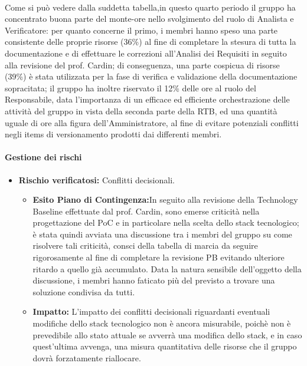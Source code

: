 \paragraph{}
Come si può vedere dalla suddetta tabella,in questo quarto periodo il gruppo ha concentrato buona parte del monte-ore nello svolgimento
del ruolo di Analista e Verificatore: per quanto concerne il primo, i membri hanno speso una parte consistente delle proprie
risorse  (36\%) al fine di completare la stesura di tutta la documentazione e di effettuare le correzioni all'Analisi dei Requisiti
in seguito alla revisione del prof. Cardin; di conseguenza, una parte cospicua di risorse (39\%) è stata utilizzata per la fase di verifica 
e validazione della documentazione sopracitata; il gruppo ha inoltre riservato il 12\% delle ore al ruolo del Responsabile, data l'importanza di un efficace
ed efficiente orchestrazione delle attività del gruppo in vista della seconda parte della RTB, ed una quantità uguale di ore alla figura dell'Amministratore, al fine
di evitare potenziali conflitti negli items di versionamento prodotti dai differenti membri.

\paragraph{Gestione dei rischi}

\begin{itemize}
    \item \textbf{Rischio verificatosi:} Conflitti decisionali.
    \begin{itemize}
        \item \textbf{Esito Piano di Contingenza:}In seguito alla revisione della Technology Baseline effettuate dal prof. Cardin, sono emerse criticità nella progettazione
        del PoC e in particolare nella scelta dello stack tecnologico; è stata quindi avviata una discussione tra i membri del gruppo su come risolvere tali criticità,
        consci della tabella di marcia da seguire rigorosamente al fine di completare la revisione PB evitando ulteriore ritardo a quello già accumulato. Data la 
        natura sensibile dell'oggetto della discussione, i membri hanno faticato più del previsto a trovare una soluzione condivisa da tutti.
        \item \textbf{Impatto:} L'impatto dei conflitti decisionali riguardanti eventuali modifiche dello stack tecnologico non è ancora misurabile, poichè non è
        prevedibile allo stato attuale  se avverrà una modifica dello stack, e in caso quest'ultima avvenga, una misura quantitativa delle risorse che il gruppo dovrà
        forzatamente riallocare.
    \end{itemize}
\end{itemize}